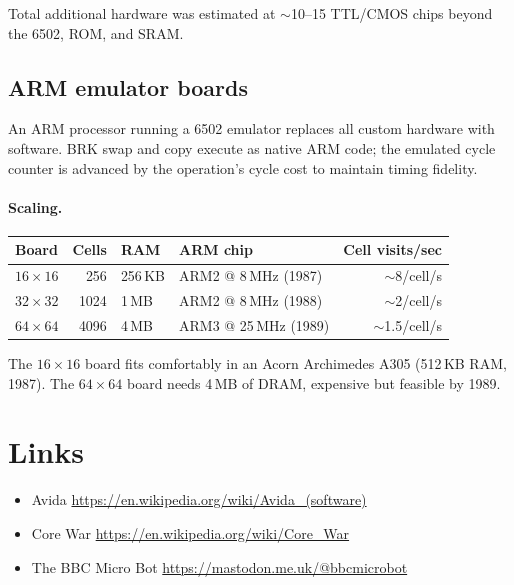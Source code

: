 \documentclass{article}
\begin{document}
Total additional hardware was estimated at $\sim$10--15 TTL/CMOS chips
beyond the 6502, ROM, and SRAM.

\subsection{ARM emulator boards}

An ARM processor running a 6502 emulator replaces all custom hardware
with software. BRK swap and copy execute as native ARM code; the
emulated cycle counter is advanced by the operation's cycle cost to
maintain timing fidelity.

\paragraph{Scaling.}

\begin{tabular}{l|r|l|l|r}
  Board & Cells & RAM & ARM chip & Cell visits/sec \\ \hline
  $16 \times 16$  & 256   & 256\,KB & ARM2 @ 8\,MHz (1987)  & $\sim$8/cell/s \\
  $32 \times 32$  & 1024  & 1\,MB   & ARM2 @ 8\,MHz (1988)  & $\sim$2/cell/s \\
  $64 \times 64$  & 4096  & 4\,MB   & ARM3 @ 25\,MHz (1989) & $\sim$1.5/cell/s
\end{tabular}

\medskip\noindent
The $16 \times 16$ board fits comfortably in an Acorn Archimedes A305
(512\,KB RAM, 1987). The $64 \times 64$ board needs 4\,MB of DRAM,
expensive but feasible by 1989.

\section{Links}
\begin{itemize}
\item Avida \cite{pmid15107231,pmid37689762} \url{https://en.wikipedia.org/wiki/Avida_(software)}
    \item Core War \url{https://en.wikipedia.org/wiki/Core_War}
    \item The BBC Micro Bot \url{https://mastodon.me.uk/@bbcmicrobot}
\end{itemize}


\end{document}
